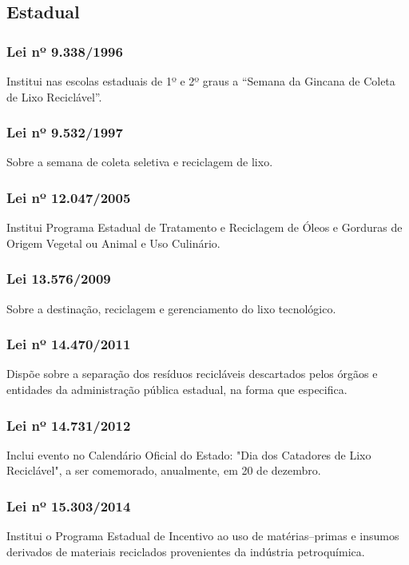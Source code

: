 \begin{subapend}
	\subsection{Estadual}
	\begin{subsubapend}
		\item \subsubsection{Lei nº 9.338/1996}
		Institui nas escolas estaduais de 1º e 2º graus a “Semana da Gincana de Coleta de Lixo Reciclável”.
		\subsubsection{Lei nº 9.532/1997}
		Sobre a semana de coleta seletiva e reciclagem de lixo.
		\subsubsection{Lei nº 12.047/2005}
		Institui Programa Estadual de Tratamento e Reciclagem de Óleos e Gorduras de Origem Vegetal ou Animal e Uso Culinário.
		\subsubsection{Lei 13.576/2009}
		Sobre a destinação, reciclagem e gerenciamento do lixo tecnológico.
		\subsubsection{Lei nº 14.470/2011}
		Dispõe sobre a separação dos resíduos recicláveis descartados pelos órgãos e entidades da administração pública estadual, na forma que especifica.
		\subsubsection{Lei nº 14.731/2012}
		Inclui evento no Calendário Oficial do Estado: "Dia dos Catadores de Lixo Reciclável", a ser comemorado, anualmente, em 20 de dezembro.
		\subsubsection{Lei nº 15.303/2014}
		Institui o Programa Estadual de Incentivo ao uso de matérias–primas e insumos derivados de materiais reciclados provenientes da indústria petroquímica.

\end{subsubapend}
\end{subapend}
